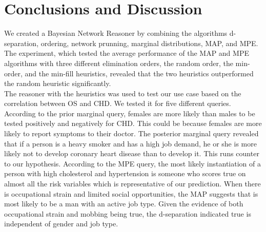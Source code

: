 \section{Conclusions and Discussion}

We created a Bayesian Network Reasoner by combining the algorithms d-separation, ordering, network prunning, marginal distributions, MAP, and MPE. The experiment, which tested the average performance of the MAP and MPE algorithms with three different elimination orders, the random order, the min-order, and the min-fill heuristics, revealed that the two heuristics outperformed the random heuristic significantly. \\
The reasoner with the heuristics was used to test our use case based on the correlation between OS and CHD. We tested it for five different queries. According to the prior marginal query, females are more likely than males to be tested positively and negatively for CHD. This could be because females are more likely to report symptoms to their doctor.
The posterior marginal query revealed that if a person is a heavy smoker and has a high job demand, he or she is more likely not to develop coronary heart disease than to develop it. This runs counter to our hypothesis.
According to the MPE query, the most likely instantiation of a person with high cholesterol and hypertension is someone who scores true on almost all the risk variables which is representative of our prediction.
When there is occupational strain and limited social opportunities, the MAP suggests that is most likely to be a man with an active job type.
Given the evidence of both occupational strain and mobbing being true, the d-separation indicated true is independent of gender and job type.